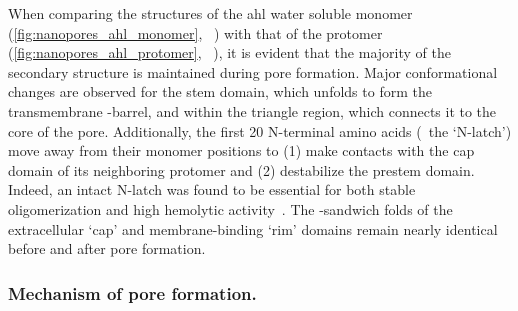 When comparing the structures of the \gls{ahl} water soluble monomer (\cref{fig:nanopores_ahl_monomer},
~\cite{Sugawara-2015}) with that of the protomer (\cref{fig:nanopores_ahl_protomer},
~\cite{Song-1996}), it is evident that the majority of the secondary structure is maintained
during pore formation. Major conformational changes are observed for the stem domain, which unfolds to form
the transmembrane \tb-barrel, and within the triangle region, which connects it to the core of the pore.
Additionally, the first 20 N-terminal amino acids (\ie~the `N-latch') move away from their monomer positions
to (1) make contacts with the cap domain of its neighboring protomer and (2) destabilize the prestem domain.
Indeed, an intact N-latch was found to be essential for both stable oligomerization and high hemolytic
activity~\cite{Song-1996}. The \tb-sandwich folds of the extracellular `cap' and membrane-binding `rim'
domains remain nearly identical before and after pore formation.

\subsubsection{Mechanism of pore formation.}
%

